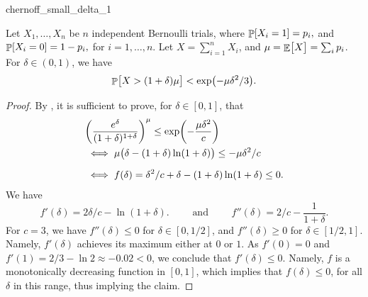 \begin{fragment}{chernoff_small_delta_1}
    \begin{lemma}
        Let $X_1, \ldots, X_n$ be $n$ independent Bernoulli trials, where
        \begin{math}
            \Prob{  X_i = 1 } =p_i,
        \end{math}
        and
        \begin{math}
            \Prob{  X_i = 0 } =1- p_i,
        \end{math}
        for $i=1,\ldots, n$.  Let $X = \sum_{i=1}^{n} X_i$, and
        $\mu = \mathop{\mathbb{E}}\!\left[ {\bigl. X} \right] = \sum_i p_i$.  For $\delta \in (0,1)$, we have
        \begin{equation*}
            \Prob{ \bigl. X > (1+\delta)\mu } < \exp \pth{-\mu \delta^2 /
               3}.
        \end{equation*}
    \end{lemma}
\end{fragment}
\begin{proof}
    By , it is sufficient to prove, for
    $\delta\in [0,1]$, that
    \begin{align*}
      & \pth{ \frac{e^\delta}{(1+\delta)^{1+\delta}}}^\mu \leq
        \exp\pth{- \frac{\mu \delta^2}{c} }
      \\
      &\iff
        \mu \bigl( \delta -(1+\delta) \ln(1+\delta) \bigr)
        \leq
        - \mu \delta^2/c
      \\[0.2cm]
      &\iff
        f(\delta) = \delta^2/c + \delta -(1+\delta) \ln(1+\delta)
        \leq 0.
    \end{align*}
    We have
    \begin{equation*}
        f'(\delta)
        = 2\delta/c  - \ln(1+\delta).
        \qquad\text{ and }\qquad%
        f''(\delta)
        = 2/c   - \frac{1}{1+\delta}.
    \end{equation*}
    For $c=3$, we have $f''(\delta) \leq 0$ for $\delta \in [0,1/2]$,
    and $f''(\delta) \geq 0$ for $\delta \in [1/2,1]$. Namely,
    $f'(\delta)$ achieves its maximum either at $0$ or $1$. As
    $f'(0) = 0$ and $f'(1) = 2/3 - \ln 2 \approx -0.02<0$, we conclude
    that $f'(\delta) \leq 0$. Namely, $f$ is a monotonically
    decreasing function in $[0,1]$, which implies that
    $f(\delta) \leq 0$, for all $\delta$ in this range, thus implying
    the claim.
\end{proof}



